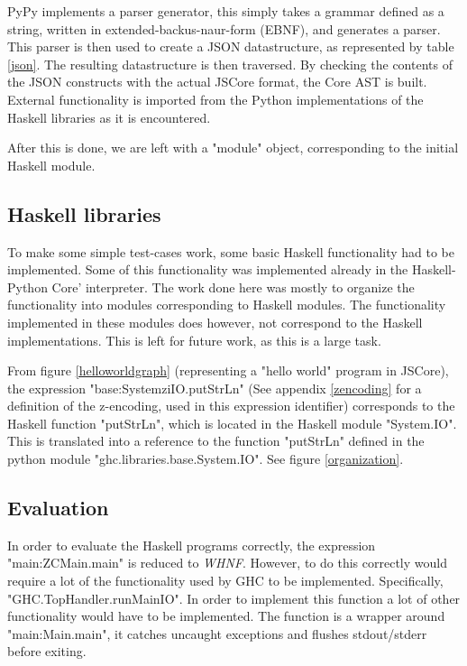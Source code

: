 PyPy implements a parser generator, this simply takes a grammar defined as a 
string, written in extended-backus-naur-form (EBNF), and generates a parser. 
This parser is then used to create a JSON datastructure, as represented by 
table \ref{json}. The resulting datastructure is then traversed. By checking the 
contents of the JSON constructs with the actual JSCore format, the Core AST is built. 
External functionality is imported from the Python implementations of the Haskell 
libraries as it is encountered. 

After this is done, we are left with a "module" object, corresponding to the initial 
Haskell module. 

\subsection{Haskell libraries}

To make some simple test-cases work, some basic Haskell functionality had to be 
implemented. Some of this functionality was implemented already in the 
Haskell-Python Core' interpreter.
The work done here was mostly to organize the functionality into modules corresponding
to Haskell modules. The functionality implemented in these modules does however, 
not correspond to the Haskell implementations. This is left for future work, as this 
is a large task.

From figure \ref{helloworldgraph} (representing a "hello world" program in JSCore), 
the expression "base:SystemziIO.putStrLn" (See appendix \ref{zencoding} for a definition of
the z-encoding, used in this expression identifier) corresponds
to the Haskell function "putStrLn", which is located in the Haskell module "System.IO". 
This is translated into a reference to the function "putStrLn" defined in the python module 
"ghc.libraries.base.System.IO". See figure \ref{organization}.

\subsection{Evaluation}
\begin{sloppypar}
In order to evaluate the Haskell programs correctly, the expression "main:ZCMain.main" 
is reduced to \emph{WHNF}. However, to do this correctly would require a lot of 
the functionality used by GHC
to be implemented. Specifically, "GHC.TopHandler.runMainIO". 
In order to implement this function
a lot of other functionality would have to be implemented. 
The function is a wrapper around 
"main:Main.main", it catches uncaught exceptions and flushes stdout/stderr 
before exiting. 
\end{sloppypar}

